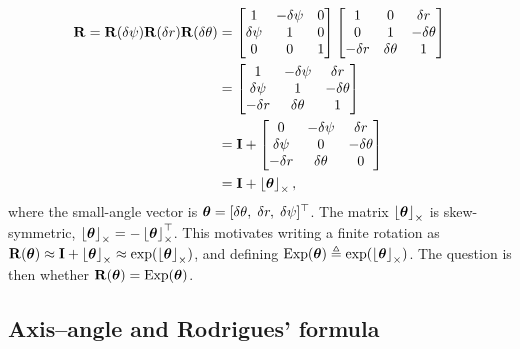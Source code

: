 \begin{align}
\boldsymbol{\mathbf{R}} = \boldsymbol{\mathbf{R}}(\delta\psi)\boldsymbol{\mathbf{R}}(\delta r)\boldsymbol{\mathbf{R}}(\delta\theta)
&= \begin{bmatrix} 1 & -\delta\psi & 0 \\ \delta\psi & 1 & 0 \\ 0 & 0 & 1 \end{bmatrix}
\begin{bmatrix} 1 & 0 & \delta r \\ 0 & 1 & -\delta\theta \\ -\delta r & \delta\theta & 1 \end{bmatrix} \notag\\
&= \begin{bmatrix} 1 & -\delta\psi & \delta r \\ \delta\psi & 1 & -\delta\theta \\ -\delta r & \delta\theta & 1 \end{bmatrix} \\
&= \boldsymbol{\mathbf{I}} + \begin{bmatrix} 0 & -\delta\psi & \delta r \\ \delta\psi & 0 & -\delta\theta \\ -\delta r & \delta\theta & 0 \end{bmatrix} \\
&= \boldsymbol{\mathbf{I}} + \left\lfloor\boldsymbol{\mathbf{\theta}}\right\rfloor_{\times},
\end{align}
where the small-angle vector is $\boldsymbol{\mathbf{\theta}} = [\delta\theta,\;\delta r,\;\delta\psi]^\top$. The matrix $\left\lfloor\boldsymbol{\mathbf{\theta}}\right\rfloor_{\times}$ is skew-symmetric, $\left\lfloor\boldsymbol{\mathbf{\theta}}\right\rfloor_{\times} = -\left\lfloor\boldsymbol{\mathbf{\theta}}\right\rfloor_{\times}^\top$. This motivates writing a finite rotation as $\boldsymbol{\mathbf{R}}(\boldsymbol{\mathbf{\theta}}) \approx \boldsymbol{\mathbf{I}} + \left\lfloor\boldsymbol{\mathbf{\theta}}\right\rfloor_{\times} \approx \exp(\left\lfloor\boldsymbol{\mathbf{\theta}}\right\rfloor_{\times})$, and defining $\operatorname{Exp}(\boldsymbol{\mathbf{\theta}}) \triangleq \exp(\left\lfloor\boldsymbol{\mathbf{\theta}}\right\rfloor_{\times})$. The question is then whether $\boldsymbol{\mathbf{R}}(\boldsymbol{\mathbf{\theta}}) = \operatorname{Exp}(\boldsymbol{\mathbf{\theta}})$.

\subsection{Axis--angle and Rodrigues' formula}

